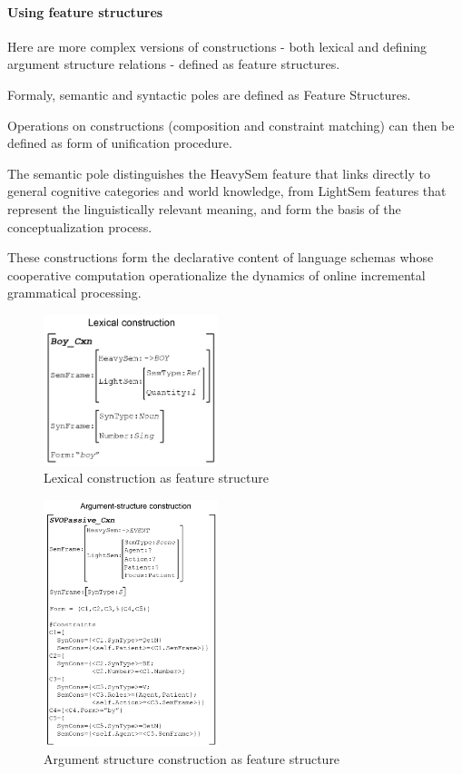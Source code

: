 \documentclass{article}
\begin{document}
\paragraph{Using feature structures}

Here are more complex versions of constructions - both lexical and defining argument structure relations - defined as feature structures.

Formaly, semantic and syntactic poles are defined as Feature Structures.

Operations on constructions (composition and constraint matching) can then be defined as form of unification procedure.

The semantic pole distinguishes the HeavySem feature that links directly to general cognitive categories and world knowledge, from LightSem features that represent the linguistically relevant meaning, and form the basis of the conceptualization process.

These constructions form the declarative content of language schemas whose cooperative computation operationalize the dynamics of online incremental grammatical processing.

\begin{figure}[H]
	\centering
	\includegraphics[width=2.0in]{Figures/constructions-FeatStruct-02.png}
	\caption{Lexical construction as feature structure}
	\label{fig:lex_cxn_feat_struct}
\end{figure}

\begin{figure}[H]
	\centering
	\includegraphics[width=2.0in]{Figures/constructions-FeatStruct-03.png}
	\caption{Argument structure construction as feature structure}
	\label{fig:comp_cxn_feat_struct}
\end{figure}
\end{document}
